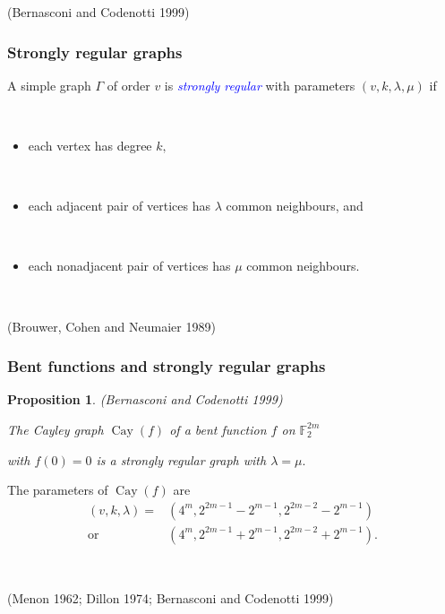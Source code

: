 \documentclass[pdf,sprung,slideColor,nocolorBG]{beamer}
\newenvironment{colortheme}[1]{
\def\ProvidesPackageRCS $##1${\relax}
\renewcommand{\ProcessOptions}{\relax}
\makeatletter

\makeatother
}{}
\newcommand{\slidecite}[1]{\tiny{(#1)}\normalsize{}}
\newcommand{\smallcite}[1]{\small{(#1)}\normalsize{}}
\newcommand{\mb}[1]{\mathbb{#1}}
\newcommand{\Emph}[1]{\emph{\textcolor{blue}{#1}}}
\newcommand{\Cay}[1]{\operatorname{Cay}\left(#1\right)}
\newcommand{\F}{\mb{F}}
\newtheorem{Proposition}{Proposition}
\begin{document}
\begin{colortheme}{seagull}
\begin{frame}
\slidecite{Bernasconi and Codenotti 1999}
\end{frame}

\begin{frame}
\frametitle{Strongly regular graphs}
A simple graph $\Gamma$ of order $v$ is \Emph{strongly regular} with parameters
$(v,k,\lambda,\mu)$ if

~

\begin{itemize}
 \item
each vertex has degree $k,$

~
 \item
each adjacent pair of vertices has $\lambda$ common neighbours, and

~
\item
each nonadjacent pair of vertices has $\mu$ common neighbours.
\end{itemize}

~

\slidecite{Brouwer, Cohen and Neumaier 1989}

\end{frame}

\begin{frame}
\frametitle{Bent functions and strongly regular graphs}

\begin{Proposition}
\smallcite{Bernasconi and Codenotti 1999}

The Cayley graph $\Cay{f}$ of a bent function $f$ on $\F_2^{2m}$

with $f(0)=0$ is a strongly regular graph with $\lambda = \mu.$
\end{Proposition}

The parameters of $\Cay{f}$ are
\begin{align*}
(v,k,\lambda) = &(4^m, 2^{2 m - 1} - 2^{m-1}, 2^{2 m - 2} - 2^{m-1})
\\
  \text{or} \quad &(4^m, 2^{2 m - 1} + 2^{m-1}, 2^{2 m - 2} + 2^{m-1}).
\end{align*}

~

\slidecite{Menon 1962; Dillon 1974; Bernasconi and Codenotti 1999}
\end{frame}
\end{colortheme}
\end{document}

